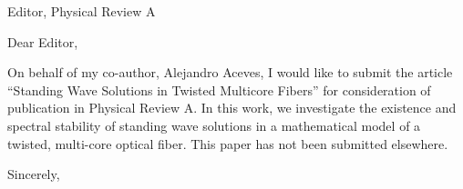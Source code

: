 \documentclass[11pt]{letter}
\begin{document}
\address{Ross Parker \\
Department of Mathematics \\
Southern Methodist University \\
Dallas, TX 75275 \\
\texttt{rhparker@smu.edu}}%
\signature{Ross Parker}
\begin{letter}{Editor, Physical Review A}

\opening{Dear Editor,}

On behalf of my co-author, Alejandro Aceves, I would like to submit the article ``Standing Wave Solutions in Twisted Multicore Fibers'' for consideration of publication in Physical Review A. In this work, we investigate the existence and spectral stability of standing wave solutions in a mathematical model of a twisted, multi-core optical fiber. This paper has not been submitted elsewhere.

\closing{Sincerely,}

\end{letter}
\end{document}

